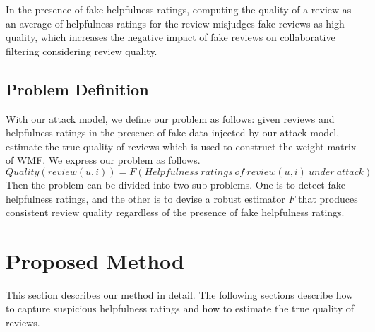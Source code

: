 \documentclass[master,english,final]{kaist-ucs}
\begin{document}
In the presence of fake helpfulness ratings, computing the quality of a review as an average of helpfulness ratings for the review misjudges fake reviews as high quality, which increases the negative impact of fake reviews on collaborative filtering considering review quality.

\section{Problem Definition}
With our attack model, we define our problem as follows: given reviews and helpfulness ratings in the presence of fake data injected by our attack model, estimate the true quality of reviews which is used to construct the weight matrix of WMF.
We express our problem as follows.
\begin{equation} \label{eq:quality_measure}
Quality(review(u,i))=F(Helpfulness\ ratings\ of\ review(u,i)\ under\ attack)
\end{equation}
Then the problem can be divided into two sub-problems.
One is to detect fake helpfulness ratings, and the other is to devise a robust estimator $F$ that produces consistent review quality regardless of the presence of fake helpfulness ratings.


\chapter{Proposed Method}
This section describes our method in detail.
The following sections describe how to capture suspicious helpfulness ratings and how to estimate the true quality of reviews.
\end{document}
